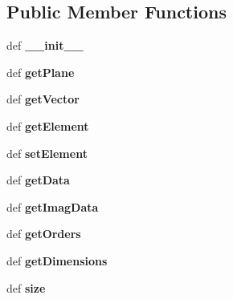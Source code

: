 \subsection*{Public Member Functions}
\begin{DoxyCompactItemize}
\item 
\hypertarget{classgauss_1_1_g_e_array_aa8dcc303789ca5449971fbd5050730c9}{def {\bfseries \-\_\-\-\_\-init\-\_\-\-\_\-}}\label{classgauss_1_1_g_e_array_aa8dcc303789ca5449971fbd5050730c9}

\item 
\hypertarget{classgauss_1_1_g_e_array_abfcdc6ef53ff7ff9670456bff8922859}{def {\bfseries get\-Plane}}\label{classgauss_1_1_g_e_array_abfcdc6ef53ff7ff9670456bff8922859}

\item 
\hypertarget{classgauss_1_1_g_e_array_a329ba6f15b4bd4163edf2df688e10537}{def {\bfseries get\-Vector}}\label{classgauss_1_1_g_e_array_a329ba6f15b4bd4163edf2df688e10537}

\item 
\hypertarget{classgauss_1_1_g_e_array_ab9ee0b8031c7b29c665534d7418e4005}{def {\bfseries get\-Element}}\label{classgauss_1_1_g_e_array_ab9ee0b8031c7b29c665534d7418e4005}

\item 
\hypertarget{classgauss_1_1_g_e_array_a07c650e84f3ab5da7b4d5cda11a2f5f5}{def {\bfseries set\-Element}}\label{classgauss_1_1_g_e_array_a07c650e84f3ab5da7b4d5cda11a2f5f5}

\item 
\hypertarget{classgauss_1_1_g_e_array_acd0b8ce90ab0ec1288c4ab38fd673509}{def {\bfseries get\-Data}}\label{classgauss_1_1_g_e_array_acd0b8ce90ab0ec1288c4ab38fd673509}

\item 
\hypertarget{classgauss_1_1_g_e_array_afef6d15feb3b25239372e8d63c72acc9}{def {\bfseries get\-Imag\-Data}}\label{classgauss_1_1_g_e_array_afef6d15feb3b25239372e8d63c72acc9}

\item 
\hypertarget{classgauss_1_1_g_e_array_a1212ac2f95ca0fba169a50aa48c41f02}{def {\bfseries get\-Orders}}\label{classgauss_1_1_g_e_array_a1212ac2f95ca0fba169a50aa48c41f02}

\item 
\hypertarget{classgauss_1_1_g_e_array_a58e73287a12d12fbfdab27c22764d386}{def {\bfseries get\-Dimensions}}\label{classgauss_1_1_g_e_array_a58e73287a12d12fbfdab27c22764d386}

\item 
\hypertarget{classgauss_1_1_g_e_array_a66f9136a26d6e15db6ce86254cda20d6}{def {\bfseries size}}\label{classgauss_1_1_g_e_array_a66f9136a26d6e15db6ce86254cda20d6}


\end{DoxyCompactItemize}
